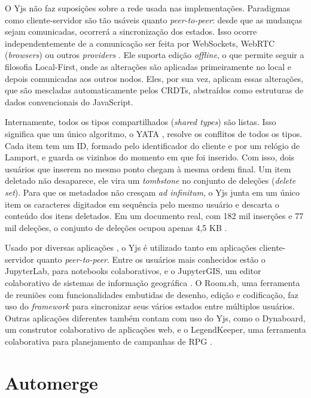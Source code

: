 O Yjs não faz suposições sobre a rede usada nas implementações. Paradigmas como cliente-servidor são tão usáveis quanto \textit{peer-to-peer}: desde que as mudanças sejam comunicadas, ocorrerá a sincronização dos estados.
Isso ocorre independentemente de a comunicação ser feita por WebSockets, WebRTC (\textit{browsers}) ou outros \textit{providers} \cite{yjs}. Ele suporta edição \textit{offline}, o que permite seguir a filosofia Local-First, onde as alterações são aplicadas
primeiramente no local e depois comunicadas aos outros nodos. Eles, por sua vez, aplicam essas alterações, que são mescladas automaticamente pelos CRDTs, abstraídos como estruturas de dados convencionais do JavaScript.

Internamente, todos os tipos compartilhados (\textit{shared types}) são listas. Isso significa que um único algoritmo, o YATA \cite{nicolaescu2016}, resolve os conflitos de todos os tipos. Cada item tem um ID, formado pelo identificador do cliente e por um relógio de Lamport, e guarda os vizinhos
do momento em que foi inserido. Com isso, dois usuários que inserem no mesmo ponto chegam à mesma ordem final. Um item deletado não desaparece, ele vira um \textit{tombstone} no conjunto de deleções (\textit{delete set}). Para que os metadados não cresçam \textit{ad infinitum},
o Yjs junta em um único item os caracteres digitados em sequência pelo mesmo usuário e descarta o conteúdo dos itens deletados. Em um documento real, com 182 mil inserções e 77 mil deleções, o conjunto de deleções ocupou apenas 4,5 KB \cite{yjsinternals}.

Usado por diversas aplicações \cite{yjs}, o Yjs é utilizado tanto em aplicações cliente-servidor quanto \textit{peer-to-peer}. Entre os usuários mais conhecidos estão o JupyterLab, para notebooks colaborativos, e o JupyterGIS, um editor colaborativo de sistemas de informação geográfica \cite{yjs, jupytergis}. O Room.sh, uma ferramenta de reuniões com funcionalidades embutidas de
desenho, edição e codificação, faz uso do \textit{framework} para sincronizar seus vários estados entre múltiplos usuários. Outras aplicações diferentes também contam com uso do Yjs, como o
Dynaboard, um construtor colaborativo de aplicações web, e o LegendKeeper, uma ferramenta colaborativa para planejamento de campanhas de RPG \cite{yjs}.

\section{Automerge}

